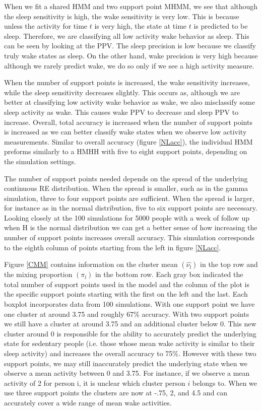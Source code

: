 \documentclass{article}
\begin{document}
When we fit a shared HMM and two support point MHMM, we see that although the sleep sensitivity is high, the wake sensitivity is very low. This is because unless the activity for time $t$ is very high, the state at time $t$ is predicted to be sleep. Therefore, we are classifying all low activity wake behavior as sleep. This can be seen by looking at the PPV. The sleep precision is low because we classify truly wake states as sleep. On the other hand, wake precision is very high because although we rarely predict wake, we do so only if we see a high activity measure.

When the number of support points is increased, the wake sensitivity increases, while the sleep sensitivity decreases slightly. This occurs as, although we are better at classifying low activity wake behavior as wake, we also misclassify some sleep activity as wake. This causes wake PPV to decrease and sleep PPV to increase. Overall, total accuracy is increased when the number of support points is increased as we can better classify wake states when we observe low activity measurements. Similar to overall accuracy (figure \ref{NLacc}), the individual HMM preforms similarly to a HMHH with five to eight support points, depending on the simulation settings.


The number of support points needed depends on the spread of the 
underlying continuous RE distribution. When the spread is smaller, 
such as in the gamma simulation, three to four support points are sufficient. 
When the spread is larger, for instance as in the normal distribution, 
five to six support points are necessary. Looking closely at the 100 
simulations for 5000 people with a week of follow up when H is 
the normal distribution we can get a better sense of how increasing 
the number of support points increases overall accuracy. 
This simulation corresponds to the eighth column of points starting 
from the left in figure \ref{NLacc}. 

Figure \ref{CMM} contains information on the cluster mean 
$(\hat{\nu_l})$ in the top row and the mixing proportion 
$(\pi_l)$ in the bottom row. Each gray box indicated the 
total number of support points used in the model and the 
column of the plot is the specific support points starting 
with the first on the left and the last. Each boxplot 
incorporates data from 100 simulations. With one support point 
we have one cluster at around 3.75 and roughly 67\% accuracy. 
With two support points we still have a cluster at around 3.75 
and an additional cluster below 0. This new cluster around 0 is 
responsible for the ability to accurately predict the underlying 
state for sedentary people (i.e. those whose mean wake activity 
is similar to their sleep activity) and increases the overall 
accuracy to 75\%. However with these two support points, we may 
still inaccurately predict the underlying state when we observe 
a mean activity between 0 and 3.75. For instance, if we observe 
a mean activity of 2 for person i, it is unclear which cluster 
person $i$ belongs to. When we use three support points the clusters 
are now at -.75, 2, and 4.5 and can accurately cover a wide range 
of mean wake activities. 
\end{document}
